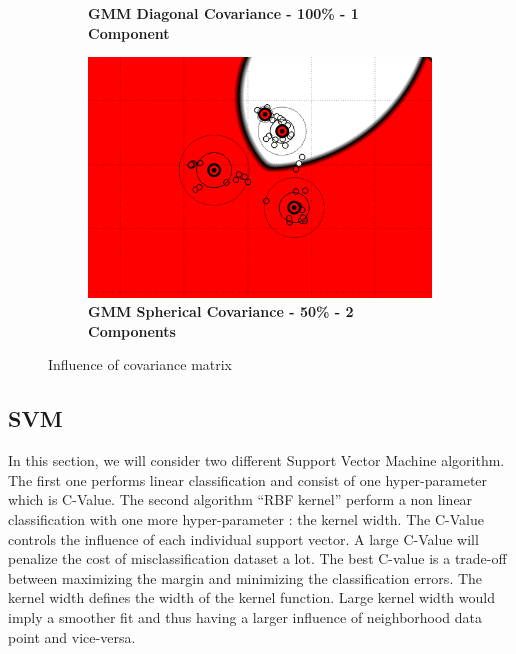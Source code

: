 \begin{figure} [ht]
\begin{subfigure}[h]{0.3\textwidth}
	\caption{\bf GMM Diagonal Covariance - 100\% - 1 Component}
    \end{subfigure}
    \hspace{3mm}
    \begin{subfigure}[h]{0.3\textwidth}
    \centering
    \includegraphics[height=0.13\textheight]{./classification/gmm_spherical_cov_50pourcent_2gmm.png}
	\caption{\bf GMM Spherical Covariance - 50\% - 2 Components}
    \end{subfigure}

\caption{Influence of covariance matrix}
\label{fig:covariance_influence}
\end{figure}



\subsection{SVM}

In this section, we will consider two different Support Vector Machine algorithm. The first one performs linear classification and consist of one hyper-parameter which is C-Value. The second algorithm “RBF kernel” perform a non linear classification with one more hyper-parameter : the kernel width. The C-Value controls the influence of each individual support vector. A large C-Value will penalize the cost of misclassification dataset a lot. The best C-value is a trade-off between maximizing the margin and minimizing the classification errors. The kernel width defines the width of the kernel function. Large kernel width would imply a smoother fit and thus having a larger influence of neighborhood data point and vice-versa. 

